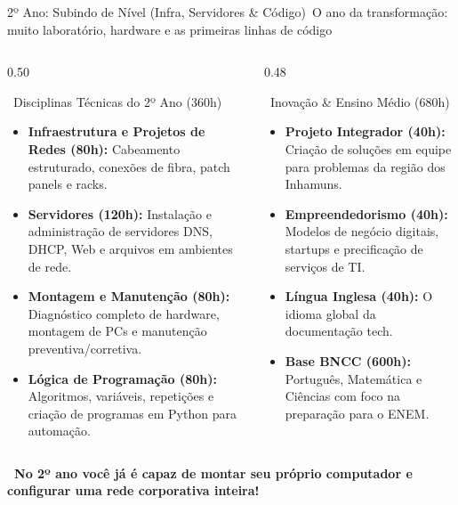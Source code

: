 \begin{frame}{2º Ano: Subindo de Nível (Infra, Servidores \& Código)}{\faCubes\ O ano da transformação: muito laboratório, hardware e as primeiras linhas de código}
  \begin{columns}[t]
    \begin{column}{0.50\textwidth}
      \begin{bluecard}{\faServer\ Disciplinas Técnicas do 2º Ano (360h)}
        \tiny
        \begin{itemize}\setlength{\itemsep}{0.15em}
          \item \textbf{Infraestrutura e Projetos de Redes (80h):} Cabeamento estruturado, conexões de fibra, patch panels e racks.
          \item \textbf{Servidores (120h):} Instalação e administração de servidores DNS, DHCP, Web e arquivos em ambientes de rede.
          \item \textbf{Montagem e Manutenção (80h):} Diagnóstico completo de hardware, montagem de PCs e manutenção preventiva/corretiva.
          \item \textbf{Lógica de Programação (80h):} Algoritmos, variáveis, repetições e criação de programas em Python para automação.
        \end{itemize}
      \end{bluecard}
    \end{column}
    
    \begin{column}{0.48\textwidth}
      \begin{greencard}{\faLightbulb\ Inovação \& Ensino Médio (680h)}
        \tiny
        \begin{itemize}\setlength{\itemsep}{0.15em}
          \item \textbf{Projeto Integrador (40h):} Criação de soluções em equipe para problemas da região dos Inhamuns.
          \item \textbf{Empreendedorismo (40h):} Modelos de negócio digitais, startups e precificação de serviços de TI.
          \item \textbf{Língua Inglesa (40h):} O idioma global da documentação tech.
          \item \textbf{Base BNCC (600h):} Português, Matemática e Ciências com foco na preparação para o ENEM.
        \end{itemize}
      \end{greencard}
    \end{column}
  \end{columns}
  
  \vspace{0.06cm}
  \begin{center}
    \tiny \textcolor{NetBlue}{\textbf{\faLaptopCode\ No 2º ano você já é capaz de montar seu próprio computador e configurar uma rede corporativa inteira!}}
  \end{center}
\end{frame}

